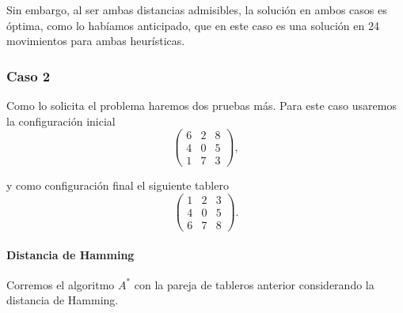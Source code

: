 \documentclass[11pt]{article}
\begin{document}
Sin embargo, al ser ambas distancias admisibles, la solución en ambos
casos es óptima, como lo habíamos anticipado, que en este caso es una
solución en 24 movimientos para ambas heurísticas.

    \hypertarget{caso-2}{%
\subsubsection{Caso 2}\label{caso-2}}

    Como lo solicita el problema haremos dos pruebas más. Para este caso
usaremos la configuración inicial
\begin{equation*}\begin{pmatrix}6&2&8\\ 4&0&5\\ 1&7&3 \end{pmatrix},\end{equation*}

    y como configuración final el siguiente tablero
\begin{equation*}\begin{pmatrix}1&2&3\\ 4&0&5\\ 6&7&8 \end{pmatrix}.\end{equation*}

    \hypertarget{distancia-de-hamming}{%
\paragraph{Distancia de Hamming}\label{distancia-de-hamming}}

    Corremos el algoritmo \(A^*\) con la pareja de tableros anterior
considerando la distancia de Hamming.
\end{document}

